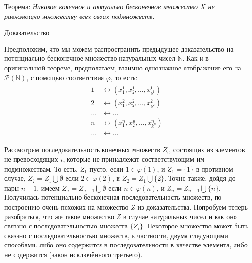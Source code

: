\documentclass[12pt]{article}
\begin{document}
Теорема: {\sl Никакое конечное и актуально бесконечное множество $X$ не равномощно множеству всех своих подмножеств.}

Доказательство: 

Предположим, что мы можем распространить предыдущее доказательство на потенциально бесконечное множество натуральных чисел $\mathbb{N}$. Как и в оригинальной теореме, предполагаем, взаимно однозначное отображение его на $\mathcal{P}(\mathbb{N})$, с помощью соответствия $\varphi$, то есть:
\begin{align}
\begin{split}
1 &\leftrightarrow (x^1_1, x^1_2, \dots, x^1_{k^1})\\
2 &\leftrightarrow  (x^2_1, x^2_2, \dots, x^2_{k^2})\\
\dots &\leftrightarrow \dots\\
n &\leftrightarrow (x^n_1, x^n_2, \dots, x^n_{k^n})\\
\dots &\leftrightarrow \dots
\label{constr:n-function}
\end{split}
\end{align}

Рассмотрим последовательность конечных множеств $Z_i$, состоящих из элементов не превосходящих $i$, которые не принадлежат соответствующим им подмножествам. То есть, $Z_1$ пусто, если $1 \in \varphi(1)$, и $Z_1 = \{1\}$ в противном случае, $Z_2 = Z_1 \bigcup \emptyset$ если $2 \in \varphi(2)$, и $Z_2 = Z_1 \bigcup \{2\}$. Точно также, дойдя до пары $n - 1$, имеем $Z_n = Z_{n - 1} \bigcup \emptyset$ если $n \in \varphi(n)$, и $Z_n = Z_{n - 1} \bigcup \{n\}$. Получилась потенциально бесконечная последовательность множеств, по построению очень похожих на множество $Z$ из доказательства. Попробуем теперь разобраться, что же такое множество $Z$ в случае натуральных чисел и как оно связано с последовательностью множеств $\{Z_i\}$. Некоторое множество может быть связано с последовательностью множеств, в частности, двумя следующими способами: либо оно содержится в последовательности в качестве элемента, либо не содержится (закон исключённого третьего).
\end{document}
